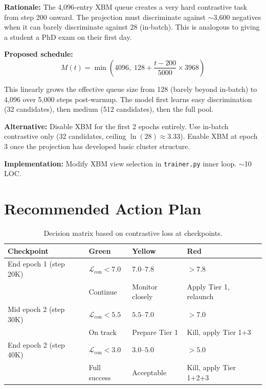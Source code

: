 \documentclass[11pt,a4paper]{article}
\newcommand{\loss}{\mathcal{L}}
\begin{document}
\textbf{Rationale:} The 4{,}096-entry XBM queue creates a very hard contrastive task
from step 200 onward. The projection must discriminate against $\sim$3{,}600 negatives
when it can barely discriminate against 28 (in-batch). This is analogous to giving
a student a PhD exam on their first day.

\textbf{Proposed schedule:}
\begin{equation}
M(t) = \min\!\left(4096,\; 128 + \frac{t - 200}{5000} \times 3968\right)
\end{equation}

This linearly grows the effective queue size from 128 (barely beyond in-batch) to
4{,}096 over 5{,}000 steps post-warmup. The model first learns easy discrimination
(32 candidates), then medium (512 candidates), then the full pool.

\textbf{Alternative:} Disable XBM for the first 2 epochs entirely. Use in-batch
contrastive only (32 candidates, ceiling $\ln(28) \approx 3.33$). Enable XBM at
epoch 3 once the projection has developed basic cluster structure.

\textbf{Implementation:} Modify XBM view selection in \texttt{trainer.py} inner loop.
$\sim$10 LOC.


\section{Recommended Action Plan}

\begin{table}[H]
\centering
\caption{Decision matrix based on contrastive loss at checkpoints.}
\label{tab:decision}
\begin{tabular}{@{}llll@{}}
\toprule
\textbf{Checkpoint} & \textbf{Green} & \textbf{Yellow} & \textbf{Red} \\
\midrule
End epoch 1 (step 20K) & $\loss_{\text{con}} < 7.0$ & $7.0$--$7.8$ & $> 7.8$ \\
& Continue & Monitor closely & Apply Tier 1, relaunch \\
\addlinespace
Mid epoch 2 (step 30K) & $\loss_{\text{con}} < 5.5$ & $5.5$--$7.0$ & $> 7.0$ \\
& On track & Prepare Tier 1 & Kill, apply Tier 1+3 \\
\addlinespace
End epoch 2 (step 40K) & $\loss_{\text{con}} < 3.0$ & $3.0$--$5.0$ & $> 5.0$ \\
& Full success & Acceptable & Kill, apply Tier 1+2+3 \\
\bottomrule
\end{tabular}
\end{table}
\end{document}
